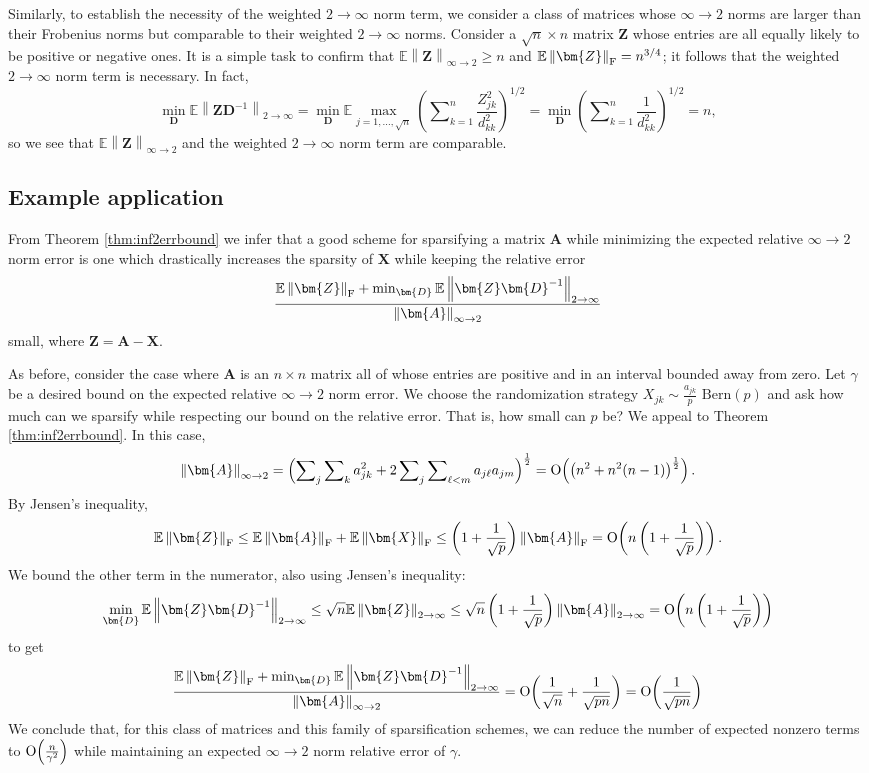 \documentclass[11pt,letterpaper,twoside,reqno]{amsart}
\newcommand{\mat}[1]{\ensuremath{\bm{#1}}}
\newcommand{\E}{\ensuremath{\mathbb{E}}}
\newcommand{\inftnorm}[1]{\ensuremath{\left\|#1\right\|_{\infty\rightarrow 2}}}
\newcommand{\twoinfnorm}[1]{\ensuremath{\left\|#1\right\|_{2 \rightarrow \infty}}}
\newcommand{\inftwo}{\ensuremath{\infty\!\rightarrow\!\!2}}
\newcommand{\twoinf}{\ensuremath{2\!\!\rightarrow\!\!\infty}}
\newcommand{\frobnorm}[1]{\ensuremath{\left\|#1\right\|_{\text{\rm F}}}}
\newcommand{\asymO}[1]{\ensuremath{\mathop{\text{\rm O}}\!\left(#1\right)}}
\begin{document}
Similarly, to establish the necessity of the weighted $\twoinf$ norm term, we consider a class of matrices whose $\inftwo$ norms are larger than their Frobenius norms but comparable to their weighted $\twoinf$ norms. Consider a $\sqrt{n}\times n$ matrix $\mat{Z}$ whose entries are all equally likely to be positive or negative ones. It is a simple task to confirm that $\E\inftnorm{\mat{Z}}\geq n$ and $\E\frobnorm{\mat{Z}}=n^{3/4}$; it follows that the weighted $\twoinf$ norm term is necessary. In fact, 
\[
\min_{\mat{D}}\E\twoinfnorm{\mat{Z}\mat{D}^{-1}}=\min_{\mat{D}}\E\max_{j=1,\ldots,\sqrt{n}}\left(\sum\nolimits_{k=1}^{n}\frac{Z_{jk}^{2}}{d_{kk}^{2}}\right)^{1/2}=\min_{\mat{D}}\left(\sum\nolimits_{k=1}^{n}\frac{1}{d_{kk}^{2}}\right)^{1/2}=n,
\]
so we see that $\E\inftnorm{\mat{Z}}$ and the weighted $\twoinf$ norm term are comparable.

\subsection{Example application}

From Theorem \ref{thm:inf2errbound} we infer that a good scheme for sparsifying a matrix $\mat{A}$ while minimizing the expected relative $\inftwo$ norm error is one which drastically increases the sparsity of $\mat{X}$ while keeping the relative error  
\[
\frac{\E\frobnorm{\mat{Z}}+\min_{\mat{D}}\E\twoinfnorm{\mat{Z}\mat{D}^{-1}}}{\inftnorm{\mat{A}}}
\]
small, where $\mat{Z} = \mat{A} - \mat{X}.$

As before, consider the case where $\mat{A}$ is an $n\times n$ matrix all of whose entries are positive and in an interval bounded away from zero. Let $\gamma$ be a desired bound on the expected relative $\inftwo$ norm error. We choose the randomization strategy $X_{jk}\sim\frac{a_{jk}}{p}\text{ Bern}(p)$ and ask how much can we sparsify while respecting our bound on the relative error. That is, how small can $p$ be? We appeal to Theorem \ref{thm:inf2errbound}. In this case, 
\[
\inftnorm{\mat{A}}=\left(\sum\nolimits_{j}\sum\nolimits_{k}a_{jk}^{2}+2\sum\nolimits_{j}\sum\nolimits_{\ell<m}a_{j\ell}a_{jm}\right)^{\frac{1}{2}}=\asymO{\left(n^{2}+n^{2}(n-1)\right)^{\frac{1}{2}}}.
\]
By Jensen's inequality, 
\[
\E\frobnorm{\mat{Z}} \leq \E\frobnorm{\mat{A}} + \E\frobnorm{\mat{X}}\leq \left(1 + \frac{1}{\sqrt{p}}\right)\frobnorm{\mat{A}} = \asymO{n \left(1 + \frac{1}{\sqrt{p}}\right)}.
\]
We bound the other term in the numerator, also using Jensen's inequality: 
\[
\min_{\mat{D}} \E\twoinfnorm{\mat{Z}\mat{D}^{-1}} \leq \sqrt{n}\E\twoinfnorm{\mat{Z}} \leq \sqrt{n}\left(1 + \frac{1}{\sqrt{p}}\right)\twoinfnorm{\mat{A}} = \asymO{n \left(1 + \frac{1}{\sqrt{p}}\right) } 
\]
to get 
\[
\frac{\E\frobnorm{\mat{Z}} + \min_{\mat{D}} \E\twoinfnorm{\mat{Z}\mat{D}^{-1}} }{\inftnorm{\mat{A}}} = \asymO{\frac{1}{\sqrt{n}} + \frac{1}{\sqrt{pn}}} = \asymO{\frac{1}{\sqrt{pn}}}
\]
We conclude that, for this class of matrices and this family of sparsification schemes, we can reduce the number of expected nonzero terms to $\asymO{\frac{n}{\gamma^{2}}}$ while maintaining an expected $\inftwo$ norm relative error of $\gamma$.
\end{document}
